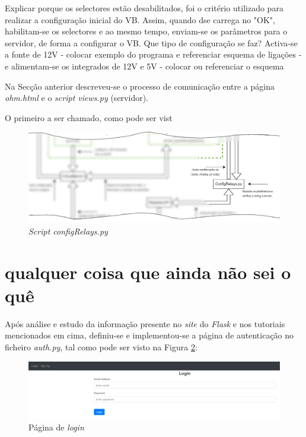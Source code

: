 Explicar porque os selectores estão desabilitados, foi o critério utilizado para realizar a configuração inicial do VB. Assim, quando dse carrega no "OK", habilitam-se os selectores e ao mesmo tempo, enviam-se os parâmetros para o servidor, de forma a configurar o VB. Que tipo de configuração se faz? Activa-se a fonte de 12V - colocar exemplo do programa e referenciar esquema de ligações - e alimentam-se os integrados de 12V e 5V - colocar ou referenciar o esquema

Na Secção anterior descreveu-se o processo de comunicação entre a página \textit{ohm.html} e o \textit{script views.py} (servidor).


O primeiro a ser chamado, como pode ser vist
\begin{figure}[hbtp]
	\centering
	\includegraphics[width=1\textwidth]{figures/ohm_diagramaCUTRelay.drawio.png}
	\caption{\textit{Script configRelays.py}}
	\label{fig:cutconfigRelays}
\end{figure}

\section{qualquer coisa que ainda não sei o quê}

Após análise e estudo da informação presente no \textit{site} do \textit{Flask} e nos tutoriais mencionados em cima, definiu-se e implementou-se a página de autenticação no ficheiro \textit{auth.py}, tal como pode ser visto na Figura \ref{fig:paglogin}:

\begin{figure}[hbtp]
	\centering
	\includegraphics[width=1\textwidth]{figures/login.png}
	\caption{Página de \textit{login}}
	\label{fig:paglogin}
\end{figure}

